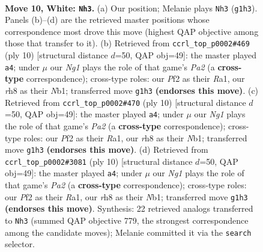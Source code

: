 \documentclass[11pt]{article}
\begin{document}
\clearpage

\begin{figure}[p]\centering
\begin{subfigure}{0.46\textwidth}\centering
\resizebox{\linewidth}{!}{%
\newchessgame
\chessboard[
  setfen={rn1qk2r/p1p1bpp1/bp3n2/3p3p/3P4/1P4P1/P2BPPBP/RN1QK1NR w KQkq - 0 10},
  showmover=false,
  pgfstyle=straightmove, color=movearrow, markmove={g1-h3}
]}
\caption{}
\end{subfigure}\hfill
\begin{subfigure}{0.46\textwidth}\centering
\resizebox{\linewidth}{!}{%
\newchessgame
\chessboard[
  setfen={rnbqkb1r/p1p2ppp/4pn2/1p6/2pP4/4PN1P/PP3PP1/RNBQKB1R w KQkq - 0 6},
  showmover=false,
  pgfstyle=straightmove, color=movearrow, markmove={a2-a4}
]}
\caption{}
\end{subfigure}
\\[4pt]
\begin{subfigure}{0.46\textwidth}\centering
\resizebox{\linewidth}{!}{%
\newchessgame
\chessboard[
  setfen={rnbqkb1r/p1p2ppp/4pn2/1p6/2pP4/4PN1P/PP3PP1/RNBQKB1R w KQkq - 0 6},
  showmover=false,
  pgfstyle=straightmove, color=movearrow, markmove={a2-a4}
]}
\caption{}
\end{subfigure}\hfill
\begin{subfigure}{0.46\textwidth}\centering
\resizebox{\linewidth}{!}{%
\newchessgame
\chessboard[
  setfen={rnbqkb1r/p1p2ppp/4pn2/1p6/2pP4/4PN1P/PP3PP1/RNBQKB1R w KQkq - 0 6},
  showmover=false,
  pgfstyle=straightmove, color=movearrow, markmove={a2-a4}
]}
\caption{}
\end{subfigure}
\caption{\textbf{Move 10, White: \texttt{Nh3}.} (a) Our position; Melanie plays \texttt{Nh3} (\texttt{g1h3}). Panels (b)--(d) are the retrieved master positions whose correspondence most drove this move (highest QAP objective among those that transfer to it). (b) Retrieved from \texttt{ccrl\_top\_p0002\#469} (ply 10) [structural distance $d$=50, QAP obj=49]: the master played \texttt{a4}; under $\mu$ our \emph{Ng1} plays the role of that game's \emph{Pa2} (a \textbf{cross-type} correspondence); cross-type roles: our \emph{P}f2 as their \emph{R}a1, our \emph{r}h8 as their \emph{N}b1; transferred move \texttt{g1h3} \textbf{(endorses this move)}. (c) Retrieved from \texttt{ccrl\_top\_p0002\#470} (ply 10) [structural distance $d$=50, QAP obj=49]: the master played \texttt{a4}; under $\mu$ our \emph{Ng1} plays the role of that game's \emph{Pa2} (a \textbf{cross-type} correspondence); cross-type roles: our \emph{P}f2 as their \emph{R}a1, our \emph{r}h8 as their \emph{N}b1; transferred move \texttt{g1h3} \textbf{(endorses this move)}. (d) Retrieved from \texttt{ccrl\_top\_p0002\#3081} (ply 10) [structural distance $d$=50, QAP obj=49]: the master played \texttt{a4}; under $\mu$ our \emph{Ng1} plays the role of that game's \emph{Pa2} (a \textbf{cross-type} correspondence); cross-type roles: our \emph{P}f2 as their \emph{R}a1, our \emph{r}h8 as their \emph{N}b1; transferred move \texttt{g1h3} \textbf{(endorses this move)}. Synthesis: 22 retrieved analogs transferred to \texttt{Nh3} (summed QAP objective 779, the strongest correspondence among the candidate moves); Melanie committed it via the \texttt{search} selector.}
\label{fig:thought-m18}
\end{figure}
\end{document}
